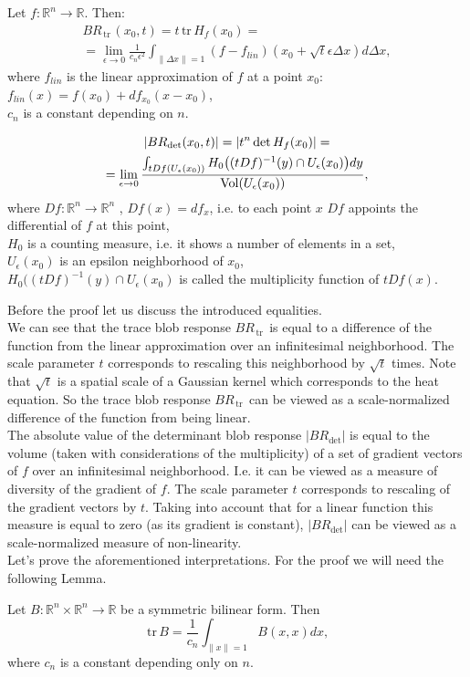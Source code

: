 \documentclass[twocolumn]{svjour3}          %
\newcommand{\Vol}{\mathop{\rm Vol}}
\newcommand{\Ueps}{U_{\epsilon}}
\newcommand{\limeps}{\lim_{\epsilon \to 0}}
\newcommand{\delx}{\Delta x}
\newcommand{\R}{\mathbb{R}}
\newcommand{\Rn}{{\mathbb{R}}^n}
\newcommand {\tr}{{\,}\mathrm{tr}{\,}}
\begin{document}
\begin{theorem} \label{SimpleInterp}
Let $f:\Rn \to \R$. Then:
\begin{multline*}BR_{\tr}(x_0, t) = t \tr H_f(x_0) = \\
 =\limeps \frac{1}{c_n \epsilon^2}
\int_{\| \delx \| = 1} (f - f_{lin})(x_0 + \sqrt{t}\epsilon \delx) d\delx, 
\end{multline*}
where $f_{lin}$ is the linear approximation of $f$ at a point $x_0$: $f_{lin}(x) = f(x_0) + df_{x_0}(x-x_0)$,
\\
$c_n$ is a constant depending on $n$.

\begin{multline*}|BR_{\det}(x_0, t)| = |t^n \det H_f(x_0)| = \\
 =\limeps \frac{
		\int_{tDf(\Ueps(x_0))} H_0 \big((tDf)^{-1}(y) \cap \Ueps(x_0) \big) dy} 
		{\Vol(\Ueps(x_0))}, \end{multline*}
where $Df:\Rn \to \Rn$ , $Df(x) = df_x$, i.e. to each point $x$ $Df$ appoints the differential of $f$ at this point,
\\
$H_0$ is a counting measure, i.e. it shows a number of elements in a set,
\\
$\Ueps(x_0)$ is an epsilon neighborhood of $x_0$,
\\
$H_0 \big((tDf)^{-1}(y) \cap \Ueps(x_0)$ is called the multiplicity function of $tDf(x)$.

\end{theorem}
Before the proof let us discuss the introduced equalities.
\\
We can see that the trace blob response $BR_{\tr}$ is equal to a difference of the function from the linear approximation over an infinitesimal neighborhood. The scale parameter $t$ corresponds to rescaling this neighborhood by $\sqrt{t}$ times. Note that $\sqrt{t}$ is a spatial scale of a Gaussian kernel which corresponds to the heat equation. So the trace blob response $BR_{\tr}$ can be viewed as a scale-normalized difference of the function from being linear.
\\
The absolute value of the determinant blob response $|BR_{\det}|$ is equal to the volume (taken with considerations of the multiplicity) of a set of gradient vectors of $f$ over an infinitesimal neighborhood. I.e. it can be viewed as a measure of diversity of the gradient of $f$. The scale parameter $t$ corresponds to rescaling of the gradient vectors by $t$. Taking into account that for a linear function this measure is equal to zero (as its gradient is constant), $|BR_{\det}|$ can be viewed as a scale-normalized measure of non-linearity.
\\
Let's prove the aforementioned interpretations. For the proof we will need the following Lemma.
\begin{lemma}  \label{BilinearFormTrace}
Let $B:\Rn \times \Rn \to \R$ be a symmetric bilinear form. Then 
$$\tr B = \frac{1} {c_n} \int_{\|x\|=1} B(x, x) dx,$$
where $c_n$ is a constant depending only on $n$.
\end{lemma} 
\end{document}
